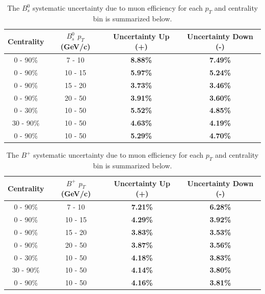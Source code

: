 \begin{table}[h]
\begin{center}
\caption{The $B^0_s$ systematic uncertainty due to muon efficiency for each $p_T$ and centrality bin is summarized below.}
\vspace{1em}
\label{BsTnPSyst}
  \begin{tabular}{| c | c |c | c|}
    \hline
     Centrality & $B^0_s$ $p_T$ (GeV/c) &Uncertainty Up (+) & Uncertainty Down (-)  \\
    \hline
    \hline
0 - 90\% & 7 - 10 &   \textbf{8.88\% }  &  \textbf{7.49\% }   \\ 
0 - 90\% & 10 - 15 & \textbf{5.97\% }  & \textbf{5.24\%}  \\ 
0 - 90\% & 15 - 20 &  \textbf{3.73\% }  & \textbf{3.46\%}   \\ 
0 - 90\% & 20 - 50 &  \textbf{3.91\% }  &  \textbf{3.60\%}   \\ 
0 - 30\% & 10 - 50 &   \textbf{5.52\% }  &  \textbf{4.85\% } \\ 
30 - 90\% & 10 - 50 & \textbf{4.63\% }  &  \textbf{4.19\% }  \\ 
0 - 90\% & 10 - 50 &  \textbf{5.29\% }  & \textbf{4.70\% }  \\ 
    \hline
    \hline
\end{tabular}
\end{center}
\end{table}


\begin{table}[h]
\begin{center}
\caption{The $B^+$ systematic uncertainty due to muon efficiency for each $p_T$ and centrality bin is summarized below.}
\vspace{1em}
\label{BPTnPSyst}
  \begin{tabular}{| c | c |c | c|}
    \hline
     Centrality & $B^+$ $p_T$ (GeV/c) &Uncertainty Up (+) & Uncertainty Down (-)  \\
    \hline
    \hline
0 - 90\% & 7 - 10 &   \textbf{7.21\% }  &  \textbf{6.28\% }   \\ 
0 - 90\% & 10 - 15 & \textbf{4.29\% }  & \textbf{3.92\%}  \\ 
0 - 90\% & 15 - 20 &  \textbf{3.83\% }  & \textbf{3.53\%}   \\ 
0 - 90\% & 20 - 50 &  \textbf{3.87\% }  &  \textbf{3.56\%}   \\ 
0 - 30\% & 10 - 50 &   \textbf{4.18\% }  &  \textbf{3.83\% } \\ 
30 - 90\% & 10 - 50 & \textbf{4.14\% }  &  \textbf{3.80\% }  \\ 
0 - 90\% & 10 - 50 &  \textbf{4.16\% }  & \textbf{3.81\% }  \\ 
    \hline
    \hline
\end{tabular}
\end{center}
\end{table}
\clearpage


